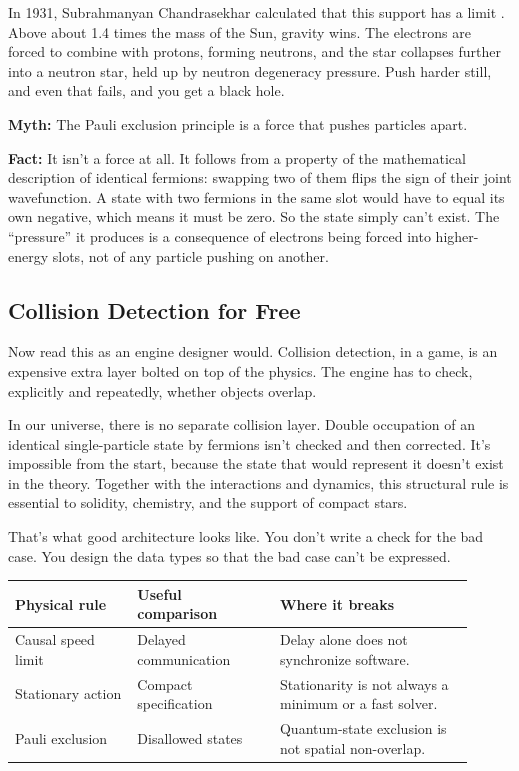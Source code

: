 In 1931, Subrahmanyan Chandrasekhar calculated that this support has a limit \cite{chandrasekhar1931}. Above about 1.4 times the mass of the Sun, gravity wins. The electrons are forced to combine with protons, forming neutrons, and the star collapses further into a neutron star, held up by neutron degeneracy pressure. Push harder still, and even that fails, and you get a black hole.

\begin{mythvsfactbox}
\textbf{Myth:} The Pauli exclusion principle is a force that pushes particles apart.

\textbf{Fact:} It isn't a force at all. It follows from a property of the mathematical description of identical fermions: swapping two of them flips the sign of their joint wavefunction. A state with two fermions in the same slot would have to equal its own negative, which means it must be zero. So the state simply can't exist. The ``pressure'' it produces is a consequence of electrons being forced into higher-energy slots, not of any particle pushing on another.
\end{mythvsfactbox}

\subsection{Collision Detection for Free}

Now read this as an engine designer would. Collision detection, in a game, is an expensive extra layer bolted on top of the physics. The engine has to check, explicitly and repeatedly, whether objects overlap.

In our universe, there is no separate collision layer. Double occupation of an identical single-particle state by fermions isn't checked and then corrected. It's impossible from the start, because the state that would represent it doesn't exist in the theory. Together with the interactions and dynamics, this structural rule is essential to solidity, chemistry, and the support of compact stars.

That's what good architecture looks like. You don't write a check for the bad case. You design the data types so that the bad case can't be expressed.

\begin{examplebox}
\begin{tabular}{@{}L{0.24\linewidth}L{0.29\linewidth}L{0.38\linewidth}@{}}
\textbf{Physical rule} & \textbf{Useful comparison} & \textbf{Where it breaks} \\
\hline
Causal speed limit & Delayed communication & Delay alone does not synchronize software. \\
Stationary action & Compact specification & Stationarity is not always a minimum or a fast solver. \\
Pauli exclusion & Disallowed states & Quantum-state exclusion is not spatial non-overlap.
\end{tabular}
\end{examplebox}

